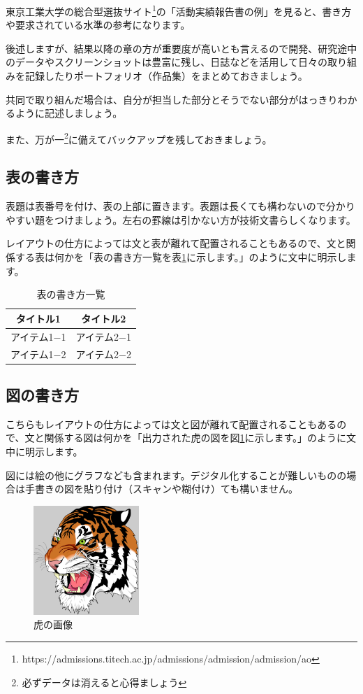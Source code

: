 \documentclass[dvipdfmx, a4paper]{jsarticle}
\begin{document}
東京工業大学の総合型選抜サイト\footnote{https://admissions.titech.ac.jp/admissions/admission/admission/ao}の「活動実績報告書の例」を見ると、書き方や要求されている水準の参考になります。

後述しますが、結果以降の章の方が重要度が高いとも言えるので開発、研究途中のデータやスクリーンショットは豊富に残し、日誌などを活用して日々の取り組みを記録したりポートフォリオ（作品集）をまとめておきましょう。

共同で取り組んだ場合は、自分が担当した部分とそうでない部分がはっきりわかるように記述しましょう。

また、万が一\footnote{必ずデータは消えると心得ましょう}に備えてバックアップを残しておきましょう。

\subsection{表の書き方}
表題は表番号を付け、表の上部に置きます。表題は長くても構わないので分かりやすい題をつけましょう。左右の罫線は引かない方が技術文書らしくなります。

レイアウトの仕方によっては文と表が離れて配置されることもあるので、文と関係する表は何かを「表の書き方一覧を表\ref{tab:label_how_to_draw_table}に示します。」のように文中に明示します。
　
\begin{table}[htbp]
    \centering
    \caption{表の書き方一覧}
    \label{tab:label_how_to_draw_table}
    \begin{tabular}{c|c} \hline
        タイトル1 & タイトル2 \\ \hline \hline
        アイテム1−1 & アイテム2−1 \\ \hline
        アイテム1−2 & アイテム2−2 \\ \hline
    \end{tabular}
\end{table}

\subsection{図の書き方}
こちらもレイアウトの仕方によっては文と図が離れて配置されることもあるので、文と関係する図は何かを「出力された虎の図を図\ref{fig:label_tiger}に示します。」のように文中に明示します。

図には絵の他にグラフなども含まれます。デジタル化することが難しいものの場合は手書きの図を貼り付け（スキャンや糊付け）ても構いません。

\begin{figure}[htbp]
    \centering
    \includegraphics[width=4cm, clip]{examples_tiger.eps}
    \caption{虎の画像}
    \label{fig:label_tiger}
\end{figure}
\end{document}
